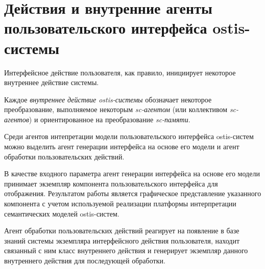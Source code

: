 \section{Действия и внутренние агенты пользовательского интерфейса ostis-системы}
\label{sec_interfaces_actions_and_agents}

Интерфейсное действие пользователя, как правило, инициирует некоторое внутреннее действие системы. 

\begin{SCn}



\end{SCn}
	
Каждое \textit{внутреннее действие ostis-системы} обозначает некоторое преобразование, выполняемое некоторым \textit{sc-агентом} (или коллективом \textit{sc-агентов}) и ориентированное на преобразование \textit{sc-памяти}.

\begin{SCn}


\end{SCn}

\bigskip
Среди агентов интепретации модели пользовательского интерфейса ostis-систем можно выделить агент генерации интерфейса на основе его модели и агент обработки пользовательских действий.

В качестве входного параметра агент генерации интерфейса на основе его модели принимает экземпляр компонента пользовательского интерфейса для отображения. Результатом работы является графическое представление указанного компонента с учетом используемой реализации платформы интерпретации семантических моделей ostis-систем.

Агент обработки пользовательских действий реагирует на появление в базе знаний системы экземпляра интерфейсного действия пользователя, находит связанный с ним класс внутреннего действия и генерирует экземпляр данного внутреннего действия для последующей обработки.


%